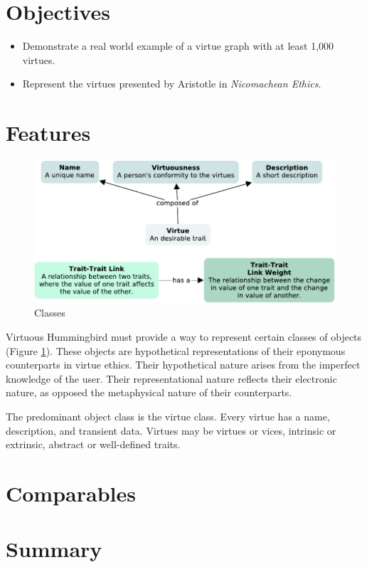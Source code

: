 \documentclass{article}
\newcommand{\name}{Virtuous Hummingbird}
\begin{document}
\section{Objectives}

\begin{itemize}
    \item Demonstrate a real world example of a virtue graph with at least 1,000 virtues.
    \item Represent the virtues presented by Aristotle in \textit{Nicomachean Ethics}.
\end{itemize}

\section{Features}

\begin{figure}[h]
    \includegraphics[width=\linewidth]{classes.pdf}
    \caption{Classes}
    \label{fig:classes}
\end{figure}

\name{} must provide a way to represent certain classes of objects (Figure \ref{fig:classes}).
These objects are hypothetical representations of their eponymous counterparts in virtue ethics.
Their hypothetical nature arises from the imperfect knowledge of the user.
Their representational nature reflects their electronic nature, as opposed the metaphysical nature of their counterparts.

The predominant object class is the virtue class.
Every virtue has a name, description, and transient data.
Virtues may be virtues or vices, intrinsic or extrinsic, abstract or well-defined traits.

\section{Comparables}


\section{Summary}

\end{document}

